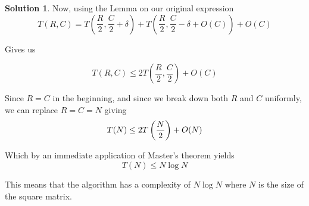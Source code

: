 \documentclass[12pt]{article}
\theoremstyle{definition}
\newtheorem*{solution}{Solution}
\begin{document}
\begin{solution}
Now, using the Lemma on our original expression
$$
T(R, C) = T\left(\frac{R}{2}, \frac{C}{2} + \delta\right) + T\left(\frac{R}{2}, \frac{C}{2} - \delta + O(C) \right) + O(C)
$$

Gives us

$$
T(R, C) \leq 2 T \left(\frac{R}{2}, \frac{C}{2} \right) + O(C)
$$

Since $R = C$ in the beginning, and since we break down both $R$ and $C$ uniformly, we can replace $R = C = N$ giving
$$
T(N) \leq  2 T \left( \frac{N}{2} \right) + O(N) \\
$$


Which by an immediate application of Master's theorem yields $$T(N) \leq N \log N$$

This means that the 
algorithm has a complexity of $N \log N$ where $N$ is the size of the square matrix.
\end{solution}
\end{document}
